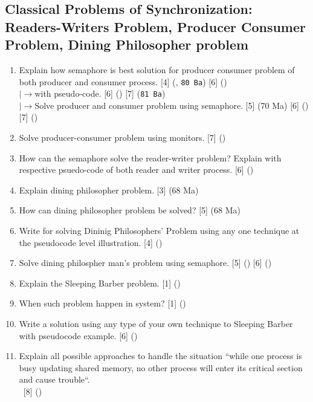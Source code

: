 \documentclass[12pt]{article}
\newcommand{\lb}{\\$\left|\rightarrow\right.$}
\newcommand{\enter}{\\\textcolor{white}{1}}
\begin{document}
	\subsection{Classical Problems of Synchronization: Readers-Writers Problem, Producer Consumer Problem, Dining Philosopher problem}
		\begin{enumerate}[noitemsep, topsep=0pt]
			\item Explain how semaphore is best solution for producer consumer problem of both producer and consumer process. \hfill [4] (, \texttt{80 Ba}) [6] ()
			\lb with pseudo-code. \hfill [6] () [7] (\texttt{81 Ba})
			\lb Solve producer and consumer problem using semaphore. \hfill [5] (70 Ma) [6] () [7] () 
			
			\item Solve producer-consumer problem using monitors. \hfill [7] ()
			
			\item How can the semaphore solve the reader-writer problem? Explain with respective psuedo-code of both reader and writer process. \hspace{7.1cm} [6] ()
			
			\item Explain dining philosopher problem. \hfill [3] (68 Ma)
			
			\item How can dining philosopher problem be solved? \hfill [5] (68 Ma)

			\item Write for solving Dininig Philosophers' Problem using any one technique at the pseudocode level illustration. \hfill [4] ()
			
			\item Solve dining philospher man's problem using semaphore. \hfill [5] () [6] ()
			
			\item Explain the Sleeping Barber problem. \hfill [1] ()
			
			\item When such problem happen in system? \hfill [1] ()
			
			\item Write a solution using any type of your own technique to Sleeping Barber with pseudocode example. \hfill [6] ()
			
			\item Explain all possible approaches to handle the situation ``while one process is busy updating shared memory, no other process will enter its critical section and cause trouble``.
			\enter\hfill [8] ()
		\end{enumerate}
\end{document}
